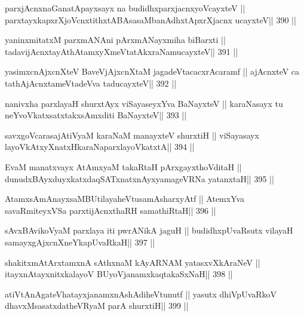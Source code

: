 \begin{shl}
parxjAcnxnaGanatA\s payxsayx na budidhxparxjacnxyoVcayxteV ||
parxtayxkapxrXjoVcnxtithxtABAsasaMbanAdhxtApxrXjacnx ucayxteV\hfill || 390 ||
\end{shl}

\begin{shl}
yaninxmitatxM parxmANAni pArxmANayxmiha biBarxti ||
tadavijAcnxtayAthAtamxyXmeVtatAkxraNamucayxteV\hfill || 391 ||
\end{shl}

\begin{shl}
yasimxcnAjxcnXteV BaveVjAjxcnXtaM jagadeVtacacxrAcaramf ||
ajAcnxteV ca tathA\s jAcnxtameVtadeVva taducayxteV\hfill || 392 ||
\end{shl}

\begin{shl}
nanivxha parxlayaH shurxtAyx viSayaseyxYva BaNayxteV ||
karaNasayx tu neYvoVkatxsatxtakxsAmxditi BaNayxteV\hfill || 393 ||
\end{shl}

\begin{shl}
savxgoVcarasajAtiVyaM karaNaM manayxteV shurxtiH ||
viSayasayx layoVkAtxyX\s natxHkaraNaparxlayoVkatxtA\hfill || 394 ||
\end{shl}

\begin{shl}
EvaM manatxvayx AtAmx\s yaM takaRtaH pArxgayxthoVditaH ||
dunudxBAyxduyxkatxdaqSATxnatxnAyxyamageVRNa yatanxtaH\hfill || 395 ||
\end{shl}

\begin{shl}
AtamxsAmAnayxsaMBUtilayaheVtusamAsharxyAtf ||
AtemxYva savaRmiteyxVSa parxtijAcnxthaRH samathiRtaH\hfill || 396 ||
\end{shl}

\begin{shl}
sAvxBAvikoV\s yaM parxlaya iti pwrANikA jaguH ||
budidhxpUvaRsutx vilayaH samayxgAjxcnXneYkapUvaRkaH\hfill || 397 ||
\end{shl}

\begin{shl}
shakitxmAtArxtamxnA sAthxnaM kAyARNAM yatasxvXkAraNeV ||
itayxnAtayxnitxkalayoV BUyoVjanamxkaqtakaSxNaH\hfill || 398 ||
\end{shl}

\begin{shl}
atiVtAnAgateVhatayxjanamxnAshAdiheVtunutf ||
yasutx dhiVpUvaRkoV dhavxMsasatxdatheVRyaM parA shurxtiH\hfill || 399 ||
\end{shl}

